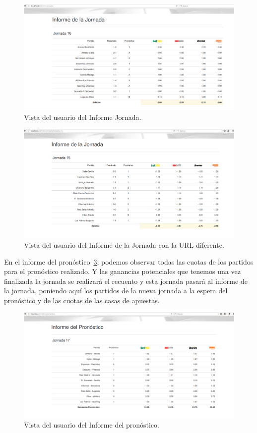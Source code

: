 \begin{figure}
\centering
\includegraphics[width=.9\textwidth]{img/drupal_inf_jornada_usuario}
\caption{Vista del usuario del Informe Jornada.}
\label{fig:InfJorDruUser}
\end{figure}

\begin{figure}
\centering
\includegraphics[width=.9\textwidth]{img/drupal_inf_jornada_usuario2}
\caption{Vista del usuario del Informe de la Jornada con la URL diferente.}
\label{fig:InfJor2DruUser}
\end{figure}

En el informe del pronóstico~\ref{fig:InfProDruUser}, podemos observar todas las cuotas de los partidos para el pronóstico realizado. Y las ganancias potenciales que tenemos una vez finalizada la jornada se realizará el recuento y esta jornada pasará al informe de la jornada, poniendo aquí los partidos de la nueva jornada a la espera del pronóstico y de las cuotas de las casas de apuestas.

\begin{figure}
\centering
\includegraphics[width=.9\textwidth]{img/drupal_inf_pronostico_usuario}
\caption{Vista del usuario del Informe del pronóstico.}
\label{fig:InfProDruUser}
\end{figure}